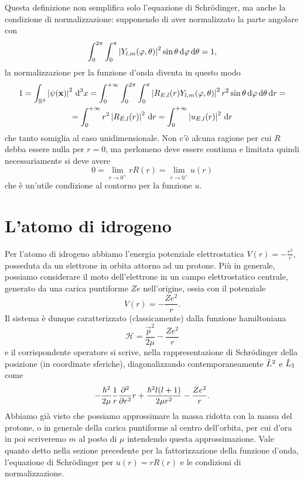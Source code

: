 Questa definizione non semplifica solo l'equazione di Schr\"odinger, ma anche la condizione di normalizzazione: supponendo di aver normalizzato la parte angolare con
\begin{equation}
	\int_0^{2\pi}\int_0^\pi\left|{Y_{l,m}(\varphi,\theta)}\right|^2\sin\theta\,\textup{d}\varphi\,\textup{d}\theta=1,
	\label{eq:normalizzazione-parte-angolare}
\end{equation}
la normalizzazione per la funzione d'onda diventa in questo modo
\begin{multline}
	1=\int_{\mathbb{R}^3}\left|{\psi(\mathbf{x})}\right|^2\,\textup{d}^3x=\int_0^{+\infty}\int_0^{2\pi}\int_0^\pi\left|{R_{E,l}(r)Y_{l,m}(\varphi,\theta)}\right|^2r^2\sin\theta\,\textup{d}\varphi\,\textup{d}\theta\,\textup{d} r=\\
	=\int_0^{+\infty}r^2\left|{R_{E,l}(r)}\right|^2\,\textup{d} r=\int_0^{+\infty}\left|{u_{E,l}(r)}\right|^2\,\textup{d} r
	\label{eq:normalizzazione-parte-radiale}
\end{multline}
che tanto somiglia al caso unidimensionale.
Non c'è alcuna ragione per cui $R$ debba essere nulla per $r=0$, ma perlomeno deve essere continua e limitata quindi necessariamente si deve avere
\begin{equation}
	0=\lim_{r\to 0^+}rR(r)=\lim_{r\to 0^+}u(r)
\end{equation}
che è un'utile condizione al contorno per la funzione $u$.

\section{L'atomo di idrogeno}
Per l'atomo di idrogeno abbiamo l'energia potenziale elettrostatica $V(r)=-\frac{e^2}{r}$, posseduta da un elettrone in orbita attorno ad un protone.
Più in generale, possiamo considerare il moto dell'elettrone in un campo elettrostatico centrale, generato da una carica puntiforme $Ze$ nell'origine, ossia con il potenziale
\begin{equation}
	V(r)=-\frac{Ze^2}{r}.
	\label{eq:potenziale-elettrostatico}
\end{equation}
Il sistema è dunque caratterizzato (classicamente) dalla funzione hamiltoniana
\begin{equation}
	\mathcal H=\frac{\vec p^2}{2\mu}-\frac{Ze^2}{r}
	\label{eq:hamiltoniana-idrogeno}
\end{equation}
e il corrispondente operatore si scrive, nella rappresentazione di Schr\"odinger della posizione (in coordinate sferiche), diagonalizzando contemporaneamente $\hat{L}^2$ e $\hat{L}_3$ come
\begin{equation}
	-\frac{\hbar^2}{2\mu}\frac1{r}\frac{\partial^2 {}}{\partial {r}^2}r+\frac{\hbar^2l(l+1)}{2\mu r^2}-\frac{Ze^2}{r}.
	\label{eq:hamiltoniano-idrogeno-schroedinger}
\end{equation}
Abbiamo già visto che possiamo approssimare la massa ridotta con la massa del protone, o in generale della carica puntiforme al centro dell'orbita, per cui d'ora in poi scriveremo $m$ al posto di $\mu$ intendendo questa approssimazione.
Vale quanto detto nella sezione precedente per la fattorizzazione della funzione d'onda, l'equazione di Schr\"odinger per $u(r)=rR(r)$ e le condizioni di normalizzazione.

